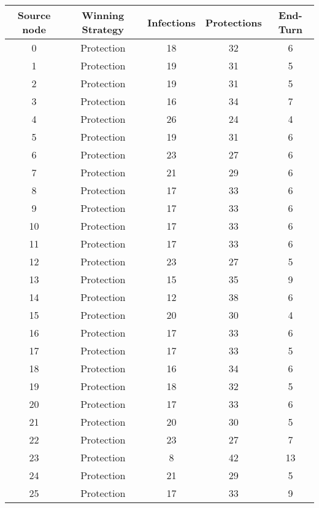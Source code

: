 \documentclass[results.tex]{subfiles}
\begin{document}
\begin{center}
  \begin{tabular}{| c || c | c | c | c |}
    \hline
    {\bfseries Source node} & {\bfseries Winning Strategy} & {\bfseries Infections} & {\bfseries Protections} & {\bfseries End-Turn} \\  %
    \hline\hline
    0 & Protection & 18 & 32 & 6 \\ 
    \hline
    1 & Protection & 19 & 31 & 5 \\ 
    \hline
    2 & Protection & 19 & 31 & 5 \\ 
    \hline
    3 & Protection & 16 & 34 & 7 \\ 
    \hline
    4 & Protection & 26 & 24 & 4 \\ 
    \hline
    5 & Protection & 19 & 31 & 6 \\ 
    \hline
    6 & Protection & 23 & 27 & 6 \\ 
    \hline
    7 & Protection & 21 & 29 & 6 \\ 
    \hline
    8 & Protection & 17 & 33 & 6 \\ 
    \hline
    9 & Protection & 17 & 33 & 6 \\ 
    \hline
    10 & Protection & 17 & 33 & 6 \\ 
    \hline
    11 & Protection & 17 & 33 & 6 \\ 
    \hline
    12 & Protection & 23 & 27 & 5 \\ 
    \hline
    13 & Protection & 15 & 35 & 9 \\ 
    \hline
    14 & Protection & 12 & 38 & 6 \\ 
    \hline
    15 & Protection & 20 & 30 & 4 \\ 
    \hline
    16 & Protection & 17 & 33 & 6 \\ 
    \hline
    17 & Protection & 17 & 33 & 5 \\ 
    \hline
    18 & Protection & 16 & 34 & 6 \\ 
    \hline
    19 & Protection & 18 & 32 & 5 \\ 
    \hline
    20 & Protection & 17 & 33 & 6 \\ 
    \hline
    21 & Protection & 20 & 30 & 5 \\ 
    \hline
    22 & Protection & 23 & 27 & 7 \\ 
    \hline
    23 & Protection & 8 & 42 & 13 \\ 
    \hline
    24 & Protection & 21 & 29 & 5 \\ 
    \hline
    25 & Protection & 17 & 33 & 9 \\ 

\end{tabular}
\end{center}
\end{document}
